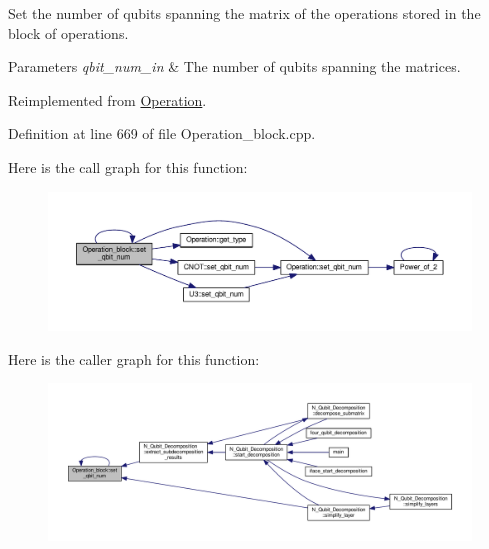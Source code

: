 Set the number of qubits spanning the matrix of the operations stored in the block of operations. 


\begin{DoxyParams}{Parameters}
{\em qbit\+\_\+num\+\_\+in} & The number of qubits spanning the matrices. \\
\hline
\end{DoxyParams}


Reimplemented from \hyperlink{class_operation_ac107f65f10f3064e64372d4d17f2ff9b}{Operation}.



Definition at line 669 of file Operation\+\_\+block.\+cpp.



Here is the call graph for this function\+:
\nopagebreak
\begin{figure}[H]
\begin{center}
\leavevmode
\includegraphics[width=350pt]{class_operation__block_acc41ac933723558df3f4e65ae1158091_cgraph}
\end{center}
\end{figure}




Here is the caller graph for this function\+:
\nopagebreak
\begin{figure}[H]
\begin{center}
\leavevmode
\includegraphics[width=350pt]{class_operation__block_acc41ac933723558df3f4e65ae1158091_icgraph}
\end{center}
\end{figure}


